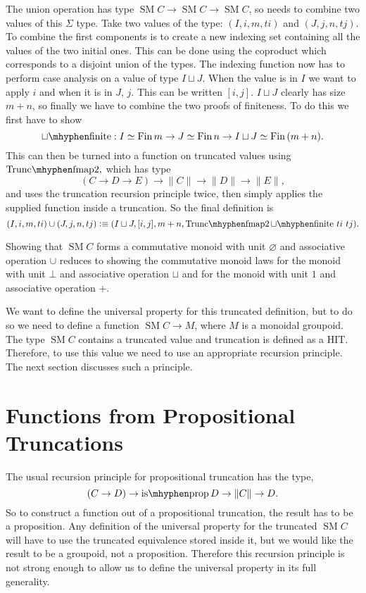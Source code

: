 \documentclass[12pt, parskip, DIV=14]{scrbook}
\newcommand{\defeq}{\vcentcolon\equiv}
\newcommand{\SM}{\operatorname{SM}}
\newcommand{\Fin}{\operatorname{Fin}}
\newcommand{\isprop}{\operatorname{is\mhyphen prop}}
\begin{document}
The union operation has type $\SM C \to \SM C \to \SM C$, so needs to combine two values of this $\Sigma$ type. Take two values of the type: $(I , i , m , ti)$ and $(J , j , n , tj)$. To combine the first components is to create a new indexing set containing all the values of the two initial ones. This can be done using the coproduct which corresponds to a disjoint union of the types. The indexing function now has to perform case analysis on a value of type $I \sqcup J$. When the value is in $I$ we want to apply $i$ and when it is in $J$, $j$. This can be written $[i,j]$. $I \sqcup J$ clearly has size $m + n$, so finally we have to combine the two proofs of finiteness. To do this we first have to show
$$\mathrm{\sqcup\mhyphen finite} : I \simeq \Fin m \to J \simeq \Fin n \to I \sqcup J \simeq \Fin\,(m + n).$$
This can then be turned into a function on truncated values using $\mathrm{Trunc\mhyphen fmap2},$ which has type
$$(C \to D \to E) \to \| C \| \to \| D \| \to \| E \|,$$ and uses the truncation recursion principle twice, then simply applies the supplied function inside a truncation. So the final definition is
$$(I , i , m , ti) \cup (J , j , n , tj) \defeq (I \sqcup J , [i , j] , m + n , \mathrm{Trunc\mhyphen fmap2}\,\mathrm{\sqcup\mhyphen finite}~ti~tj).$$

Showing that $\SM C$ forms a commutative monoid with unit $\varnothing$ and associative operation $\cup$ reduces to showing the commutative monoid laws for the monoid with unit $\bot$ and associative operation $\sqcup$ and for the monoid with unit $1$ and associative operation $+$.


We want to define the universal property for this truncated definition, but to do so we need to define a function $\SM C \to M$, where $M$ is a monoidal groupoid. The type $\SM C$ contains a truncated value and truncation is defined as a HIT. Therefore, to use this value we need to use an appropriate recursion principle. The next section discusses such a principle.

\section{Functions from Propositional Truncations}

The usual recursion principle for propositional truncation has the type,
$$(C \to D) \to \isprop D \to \| C \| \to D.$$
So to construct a function out of a propositional truncation, the result has to be a proposition. Any definition of the universal property for the truncated $\SM C$ will have to use the truncated equivalence stored inside it, but we would like the result to be a groupoid, not a proposition. Therefore this recursion principle is not strong enough to allow us to define the universal property in its full generality.
\end{document}
